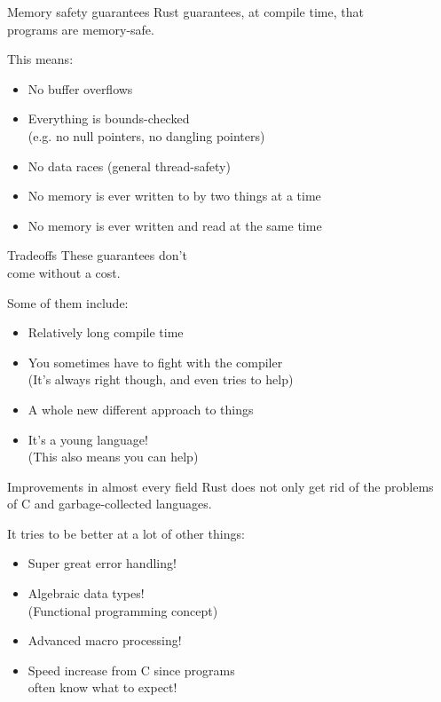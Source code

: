 \documentclass[usenames,dvipsnames,10pt,aspectratio=169]{beamer}
\begin{document}
\begin{frame}{Memory safety guarantees}
\large
Rust guarantees, at compile time, that\\
programs are memory-safe.\\

\vspace{0.3cm}

This means:
\begin{itemize}
	\item No buffer overflows
	\item Everything is bounds-checked\\ (e.g. no null pointers, no dangling pointers)
	\item No data races (general thread-safety)
	\item No memory is ever written to by two things at a time
	\item No memory is ever written and read at the same time
\end{itemize}
\end{frame}

\begin{frame}{Tradeoffs}
\large
These guarantees don't\\
come without a cost.

\vspace{0.3cm}

Some of them include:
\begin{itemize}
	\item Relatively long compile time
	\item You sometimes have to fight with the compiler\\
		(It's always right though, and even tries to help)
	\item A whole new different approach to things
	\item It's a young language!\\
		(This also means you can help)
\end{itemize}
\end{frame}

\begin{frame}{Improvements in almost every field} 
	\large
Rust does not only get rid of the problems\\
of C and garbage-collected languages.
\vspace{0.3cm}

It tries to be better at a lot of other things:
\begin{itemize}
	\item Super great error handling!
	\item Algebraic data types!\\
		(Functional programming concept)
	\item Advanced macro processing!
	\item Speed increase from C since programs \\
		often know what to expect!
\end{itemize}
\end{frame}
\end{document}
